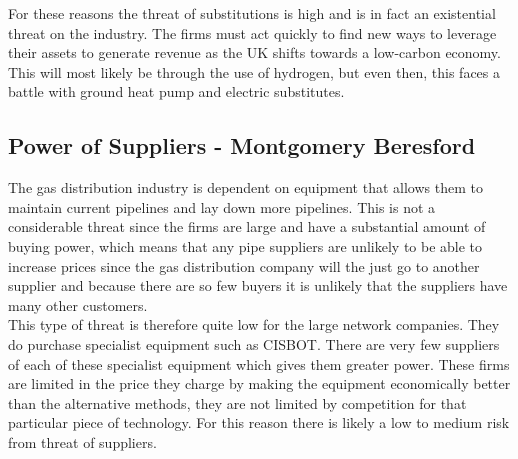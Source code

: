 \documentclass[11pt]{article}		%
\begin{document}
                For these reasons the threat of substitutions is high and is in fact an existential threat on the industry. The firms must act quickly to find new ways to leverage their assets to generate revenue as the UK shifts towards a low-carbon economy. This will most likely be through the use of hydrogen, but even then, this faces a battle with ground heat pump and electric substitutes.

     
		\subsection[Power of Suppliers]{Power of Suppliers - Montgomery Beresford}
		        The gas distribution industry is dependent on equipment that allows them to maintain current pipelines and lay down more pipelines. 
		        This is not a considerable threat since the firms are large and have a substantial amount of buying power, which means that any pipe suppliers are unlikely to be able to increase prices since the gas distribution company will the just go to another supplier and because there are so few buyers it is unlikely that the suppliers have many other customers. 
		        \\
		        This type of threat is therefore quite low for the large network companies.
                They do purchase specialist equipment such as CISBOT. There are very few suppliers of each of these specialist equipment which gives them greater power. These firms are limited in the price they charge by making the equipment economically better than the alternative methods, they are not limited by competition for that particular piece of technology.
                For this reason there is likely a low to medium risk from threat of suppliers.

		
\end{document}
